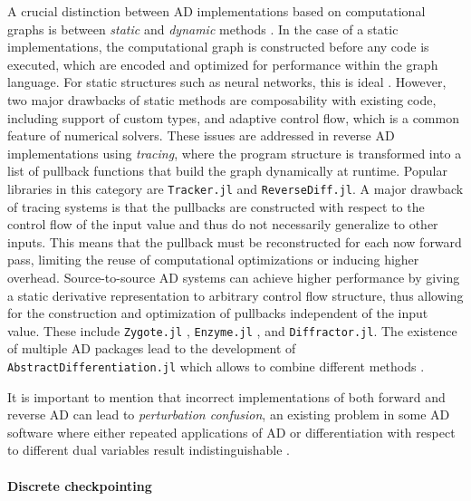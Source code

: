 A crucial distinction between AD implementations based on computational graphs is between \textit{static} and \textit{dynamic} methods \cite{Baydin_Pearlmutter_Radul_Siskind_2015}. 
In the case of a static implementations, the computational graph is constructed before any code is executed, which are encoded and optimized for performance within the graph language. 
For static structures such as neural networks, this is ideal \cite{abadi-tensorflow}. 
However, two major drawbacks of static methods are composability with existing code, including support of custom types, and adaptive control flow, which is a common feature of numerical solvers. 
These issues are addressed in reverse AD implementations using \textit{tracing}, where the program structure is transformed into a list of pullback functions that build the graph dynamically at runtime. 
Popular libraries in this category are \texttt{Tracker.jl} and \texttt{ReverseDiff.jl}. 
A major drawback of tracing systems is that the pullbacks are constructed with respect to the control flow of the input value and thus do not necessarily generalize to other inputs. 
This means that the pullback must be reconstructed for each now forward pass, limiting the reuse of computational optimizations or inducing higher overhead. 
Source-to-source AD systems can achieve higher performance by giving a static derivative representation to  arbitrary control flow structure, thus allowing for the construction and optimization of pullbacks independent of the input value. 
These include \texttt{Zygote.jl} \cite{Innes_Zygote}, \texttt{Enzyme.jl} \cite{moses_Enzyme, Moses.2021}, and \texttt{Diffractor.jl}.
The existence of multiple AD packages lead to the development of \texttt{AbstractDifferentiation.jl} which allows to combine different methods \cite{Schäfer_Tarek_White_Rackauckas_2021}. 

It is important to mention that incorrect implementations of both forward and reverse AD can lead to \textit{perturbation confusion}, an existing problem in some AD software where either repeated applications of AD or differentiation with respect to different dual variables  result indistinguishable \cite{siskind2005perturbation, manzyuk2019perturbation}. 

\paragraph{Discrete checkpointing}
\label{section:checkpointing}

